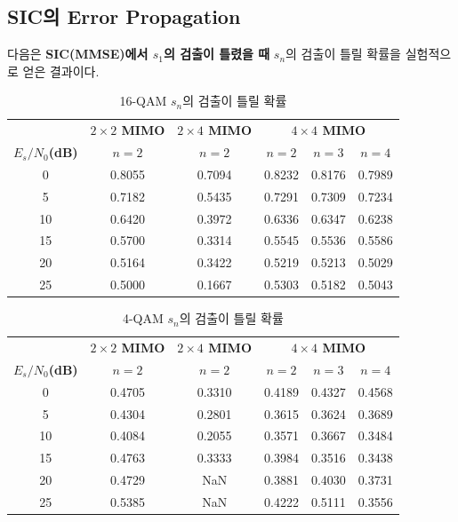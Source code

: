 \documentclass{article}
\newcommand{\bd}{\textbf} %
\begin{document}
\subsection{SIC의 Error Propagation}
다음은 \bd{SIC(MMSE)에서 $s_1$의 검출이 틀렸을 때 }$s_n$의 검출이 틀릴 확률을 실험적으로 얻은 결과이다.
\begin{table}[H]
\centering
\begin{tabular}{cccccc}
\toprule
\multicolumn{1}{c}{} & \multicolumn{1}{c}{\textbf{$2\times2$ MIMO}} & \multicolumn{1}{c}{\textbf{$2\times4$ MIMO}} & \multicolumn{3}{c}{\textbf{$4\times4$ MIMO}} \\
\cmidrule(rl){2-2} \cmidrule(rl){3-3} \cmidrule(rl){4-6}
\textbf{$E_s/N_0$(dB)} & {$n=2$} & {$n=2$} & {$n=2$} & {$n=3$} & {$n=4$}\\
\midrule
0 & 0.8055&0.7094& 0.8232 & 0.8176 & 0.7989\\
5 & 0.7182&0.5435&0.7291 & 0.7309 & 0.7234\\
10 & 0.6420&0.3972&0.6336 & 0.6347 & 0.6238\\
15 &0.5700&0.3314& 0.5545 & 0.5536 & 0.5586\\
20 & 0.5164&0.3422&0.5219 & 0.5213 & 0.5029\\
25 & 0.5000&0.1667&0.5303 & 0.5182 & 0.5043\\
\bottomrule
\end{tabular}
\caption{16-QAM $s_n$의 검출이 틀릴 확률}
\end{table}

\begin{table}[H]
\centering
\begin{tabular}{cccccc}
\toprule
\multicolumn{1}{c}{} & \multicolumn{1}{c}{\textbf{$2\times2$ MIMO}} & \multicolumn{1}{c}{\textbf{$2\times4$ MIMO}} & \multicolumn{3}{c}{\textbf{$4\times4$ MIMO}} \\
\cmidrule(rl){2-2} \cmidrule(rl){3-3} \cmidrule(rl){4-6}
\textbf{$E_s/N_0$(dB)} & {$n=2$} & {$n=2$} & {$n=2$} & {$n=3$} & {$n=4$}\\
\midrule
0 & 0.4705 & 0.3310 & 0.4189   & 0.4327  &  0.4568\\
5 & 0.4304 & 0.2801 & 0.3615  &  0.3624  &  0.3689\\
10 & 0.4084 & 0.2055 & 0.3571  &  0.3667   & 0.3484\\
15 & 0.4763 & 0.3333 &0.3984  &  0.3516  &  0.3438\\
20 & 0.4729 & NaN&0.3881 &   0.4030  &  0.3731\\
25 & 0.5385  & NaN&0.4222   & 0.5111 &   0.3556\\
\bottomrule
\end{tabular}
\caption{4-QAM $s_n$의 검출이 틀릴 확률}
\end{table}
\end{document}
